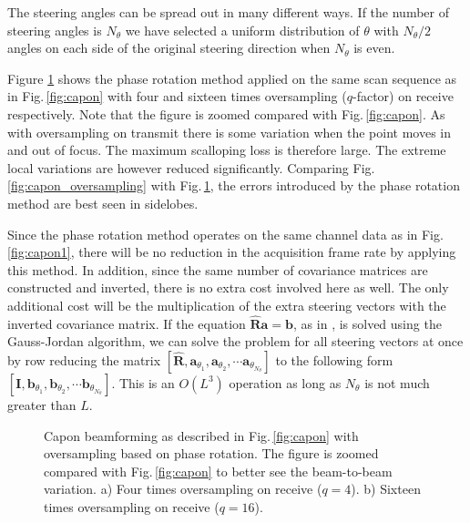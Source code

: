 \documentclass[draftcls]{IEEEtran}
\newcommand{\mat}[1]{\mathbf{#1}}
\renewcommand{\vec}[1]{\mathbf{#1}}
\newcommand{\img}{img/}
\begin{document}
The steering angles can be spread out in many different ways. If the number of steering angles is $N_\theta$ we have selected a uniform distribution of $\theta$  with $N_\theta/2$ angles on each side of the original steering direction when $N_\theta$ is even.%

Figure \ref{fig:capon_oversampling_pr} shows the phase rotation method applied on the same scan sequence as in Fig.\,\ref{fig:capon} with four and sixteen times oversampling ($q$-factor) on receive respectively. Note that the figure is zoomed compared with Fig.\,\ref{fig:capon}. As with oversampling on transmit there is some variation when the point moves in and out of focus. The maximum scalloping loss is therefore large. The extreme local variations are however reduced significantly. Comparing Fig.\,\ref{fig:capon_oversampling} with Fig.\,\ref{fig:capon_oversampling_pr}, the errors introduced by the phase rotation method are best seen in sidelobes.  

Since the phase rotation method operates on the same channel data as in Fig.\,\ref{fig:capon1}, there will be no reduction in the acquisition frame rate by applying this method. In addition, since the same number of covariance matrices are constructed and inverted, there is no extra cost involved here as well. The only additional cost will be the multiplication of the extra steering vectors with the inverted covariance matrix. If the equation $\mat{\hat{R}}\vec{a} = \vec{b}$, as in \cite{Asen}, is solved using the Gauss-Jordan algorithm, we can solve the problem for all steering vectors at once by row reducing the matrix $[\mat{\hat{R}},  \vec{a}_{\theta_1}, \vec{a}_{\theta_2}, \cdots \vec{a}_{\theta_{N_\theta}}]$ to the following form $[\mat{I},  \vec{b}_{\theta_1}, \vec{b}_{\theta_2}, \cdots \vec{b}_{\theta_{N_\theta}}]$. This is an $O(L^3)$ operation as long as $N_\theta$ is not much greater than $L$.

\begin{figure}[!t]
	\centerline{
	}
	\caption{Capon beamforming as described in Fig.\,\ref{fig:capon} with oversampling based on phase rotation. The figure is zoomed compared with Fig.\,\ref{fig:capon} to better see the beam-to-beam variation. a) Four times oversampling on receive ($q=4$). b) Sixteen times oversampling on receive ($q=16$).}
	\label{fig:capon_oversampling_pr}
\end{figure}
\end{document}
